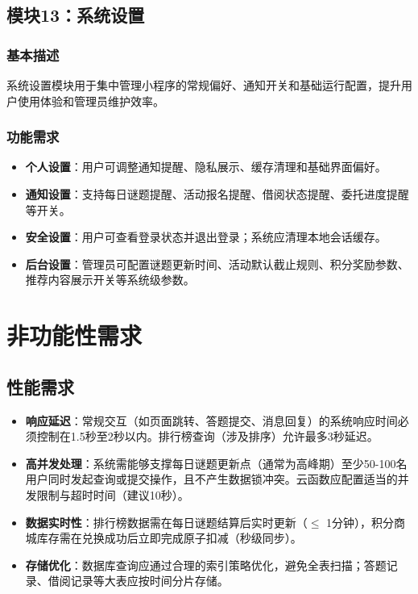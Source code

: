 \documentclass[a4paper,12pt]{article}
\begin{document}
\subsection{模块13：系统设置}
\subsubsection{基本描述}
系统设置模块用于集中管理小程序的常规偏好、通知开关和基础运行配置，提升用户使用体验和管理员维护效率。

\subsubsection{功能需求}
\begin{itemize}
    \item \textbf{个人设置}：用户可调整通知提醒、隐私展示、缓存清理和基础界面偏好。
    \item \textbf{通知设置}：支持每日谜题提醒、活动报名提醒、借阅状态提醒、委托进度提醒等开关。
    \item \textbf{安全设置}：用户可查看登录状态并退出登录；系统应清理本地会话缓存。
    \item \textbf{后台设置}：管理员可配置谜题更新时间、活动默认截止规则、积分奖励参数、推荐内容展示开关等系统级参数。
\end{itemize}

\section{非功能性需求}

\subsection{性能需求}
\begin{itemize}
    \item \textbf{响应延迟}：常规交互（如页面跳转、答题提交、消息回复）的系统响应时间必须控制在1.5秒至2秒以内。排行榜查询（涉及排序）允许最多3秒延迟。
    \item \textbf{高并发处理}：系统需能够支撑每日谜题更新点（通常为高峰期）至少50-100名用户同时发起查询或提交操作，且不产生数据锁冲突。云函数应配置适当的并发限制与超时时间（建议10秒）。
    \item \textbf{数据实时性}：排行榜数据需在每日谜题结算后实时更新（$\leq$ 1分钟），积分商城库存需在兑换成功后立即完成原子扣减（秒级同步）。
    \item \textbf{存储优化}：数据库查询应通过合理的索引策略优化，避免全表扫描；答题记录、借阅记录等大表应按时间分片存储。
\end{itemize}
\end{document}
